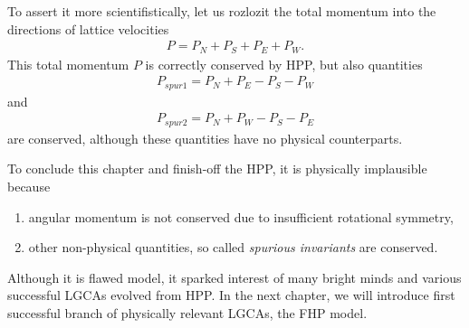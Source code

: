 To assert it more scientifistically, let us rozlozit the total momentum into the directions of lattice velocities
\begin{align} 
P = P_N + P_S + P_E + P_W.
\end{align}
This total momentum $P$ is correctly conserved by HPP, but also quantities
\begin{align} \label{zanet}
P_{spur1} = P_N + P_E - P_S - P_W
\end{align}
and
\begin{align}
P_{spur2} = P_N + P_W - P_S - P_E
\end{align}
are conserved, although these quantities have no physical counterparts.

\bigskip

To conclude this chapter and finish-off the HPP, it is physically implausible because
\begin{enumerate}
\item angular momentum is not conserved due to insufficient rotational symmetry,
\item other non-physical quantities, so called \textit{spurious invariants} are conserved.
\end{enumerate}

Although it is flawed model, it sparked interest of many bright minds and various successful LGCAs evolved from HPP. In the next chapter, we will introduce first successful branch of physically relevant LGCAs, the FHP model.